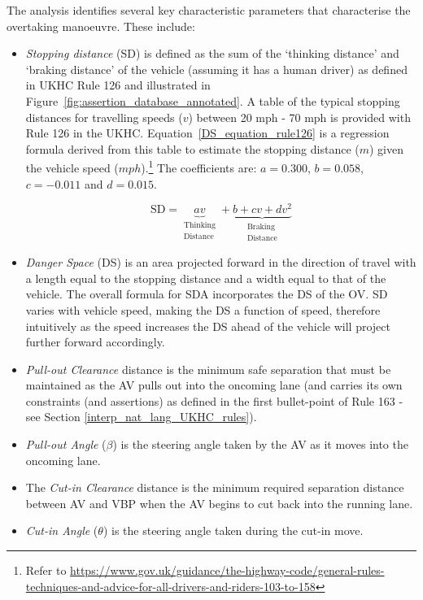 The analysis identifies several key characteristic parameters that characterise the overtaking manoeuvre. These include:
\begin{itemize}
    \item \emph{Stopping distance} (SD) is defined as the sum of the `thinking distance' and `braking distance' of the vehicle (assuming it has a human driver) as defined in UKHC Rule 126 and illustrated in Figure~\ref{fig:assertion_database_annotated}.
    A table of the typical stopping distances for travelling speeds ($v$) between 20 mph - 70 mph is provided with Rule 126 in the UKHC.
    Equation~\ref{DS_equation_rule126} is a regression formula derived from this table to estimate the stopping distance ($m$) given the vehicle speed ($mph$).\footnote{Refer to \url{https://www.gov.uk/guidance/the-highway-code/general-rules-techniques-and-advice-for-all-drivers-and-riders-103-to-158}} The coefficients are: $a=0.300$, $b=0.058$, $c=-0.011$ and $d=0.015$.
    
\begin{equation} 
\label{DS_equation_rule126}
\text{SD} = \underbrace{av }_{\substack{\text{Thinking} \\ \text{Distance}}} + \underbrace{b + cv + dv^2}_{\substack{\text{Braking} \\ \text{Distance}}}
\end{equation}

    \item \emph{Danger Space} (DS) is an area projected forward in the direction of travel with a length equal to the stopping distance and a width equal to that of the vehicle. The overall formula for SDA incorporates the DS of the OV.
    SD varies with vehicle speed, making the DS a function of speed, therefore intuitively as the speed increases the DS ahead of the vehicle will project further forward accordingly.
    
    \item \emph{Pull-out Clearance} distance is the minimum safe separation that must be maintained as the AV pulls out into the oncoming lane (and carries its own constraints (and assertions) as defined in the first bullet-point of Rule 163 - see Section \ref{interp_nat_lang_UKHC_rules}).
    
    \item \emph{Pull-out Angle} ($\beta$) is the steering angle taken by the AV as it moves into the oncoming lane.
    
    \item The \emph{Cut-in Clearance} distance is the minimum required separation distance between AV and VBP when the AV begins to cut back into the running lane.
    
    \item \emph{Cut-in Angle} ($\theta$) is the steering angle taken during the cut-in move.
\end{itemize}


